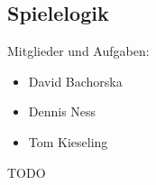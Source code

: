 \subsection{Spielelogik}
\label{spielelogik}

Mitglieder und Aufgaben:
\begin{itemize}
  \item
    David Bachorska
  \item
    Dennis Ness
  \item
    Tom Kieseling
\end{itemize}
TODO
